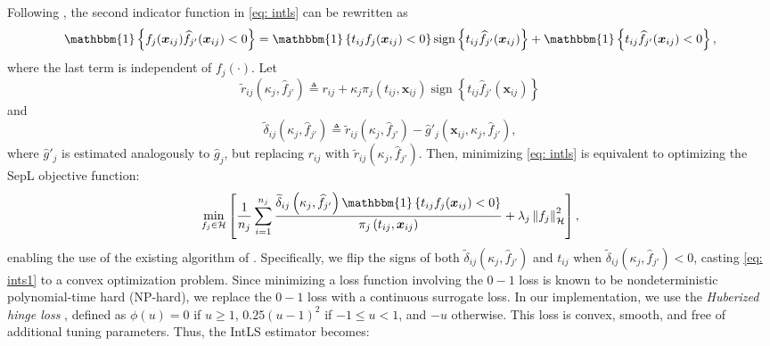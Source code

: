 \documentclass[12pt]{article}
\DeclareMathOperator{\sign}{sign}
\begin{document}
Following \cite{qiu2024integrative}, the second indicator function in \eqref{eq: intls} can be rewritten as
\begin{equation}
\label{eq: qiu_equivalent}
    \mathbbm{1}\left\{f_j(\boldsymbol x_{ij})\widehat{f}_{j'}(\boldsymbol x_{ij})<0\right\}=\mathbbm{1}\left\{t_{ij}f_j(\boldsymbol x_{ij})<0\right\}\sign\left\{t_{ij}\widehat{f}_{j'}(\boldsymbol x_{ij})\right\}+\mathbbm{1}\left\{t_{ij}\widehat{f}_{j'}(\boldsymbol x_{ij})<0\right\},
\end{equation}
where the last term is independent of $f_j(\cdot)$. Let 
\begin{equation}
\label{eq: por}
\widetilde{r}_{ij}\left(\kappa_j, \widehat{f}_{j'}\right)\triangleq r_{ij}+\kappa_j\pi_j\left(t_{ij},\boldsymbol x_{ij}\right)\sign\left\{t_{ij}\widehat{f}_{j'}(\boldsymbol x_{ij})\right\}
\end{equation} 
and 
\begin{equation}
\label{eq: pod}
\widetilde{\delta}_{ij}\left(\kappa_j, \widehat{f}_{j'}\right)\triangleq \widetilde{r}_{ij}\left(\kappa_j, \widehat{f}_{j'}\right)-\widehat{g}'_j\left(\boldsymbol x_{ij},\kappa_j, \widehat{f}_{j'}\right),
\end{equation} 
where $\widehat{g}'_j$ is estimated analogously to $\widehat{g}_j$, but replacing $r_{ij}$ with $\widetilde{r}_{ij}\left(\kappa_j, \widehat{f}_{j'}\right)$. Then, minimizing \eqref{eq: intls} is equivalent to optimizing the SepL objective function:
\begin{equation}
\label{eq: ints1}
\min_{f_j\in\mathcal{H}}\left[\frac{1}{n_j}\sum^{n_j}_{i=1}\frac{\widetilde{\delta}_{ij}\left(\kappa_j, \widehat{f}_{j'}\right)\mathbbm{1}\left\{t_{ij}f_j(\boldsymbol x_{ij})<0\right\}}{\pi_j\left(t_{ij},\boldsymbol x_{ij}\right)}+\lambda_j\left\|f_j\right\|^2_\mathcal{H}\right],
\end{equation}
enabling the use of the existing algorithm of \cite{liu2018augmented}. Specifically, we flip the signs of both $\widetilde{\delta}_{ij}\left(\kappa_j, \widehat{f}_{j'}\right)$ and $t_{ij}$ when $\widetilde{\delta}_{ij}\left(\kappa_j, \widehat{f}_{j'}\right)<0$, casting \eqref{eq: ints1} to a convex optimization problem. Since minimizing a loss function involving the $0-1$ loss is known to be nondeterministic polynomial-time hard (NP-hard), we replace the $0-1$ loss with a continuous surrogate loss. In our implementation, we use the {\it Huberized hinge loss} \citep{rosset2007piecewise}, defined as $\phi(u)= 0$ if $u\geq1$, $0.25(u-1)^2$ if $-1\leq u<1$, and $-u$ otherwise. This loss is convex, smooth, and free of additional tuning parameters. Thus, the IntLS estimator becomes: 
\end{document}
